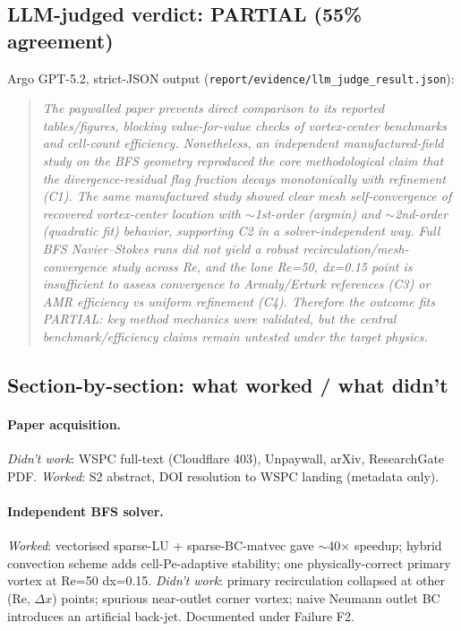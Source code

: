 \documentclass[11pt,letterpaper]{article}
\begin{document}
\subsection{LLM-judged verdict: PARTIAL (55\% agreement)}
Argo GPT-5.2, strict-JSON output (\texttt{report/evidence/llm\_judge\_result.json}):
\begin{quote}\itshape
The paywalled paper prevents direct comparison to its reported tables/figures, blocking
value-for-value checks of vortex-center benchmarks and cell-count efficiency. Nonetheless,
an independent manufactured-field study on the BFS geometry reproduced the core
methodological claim that the divergence-residual flag fraction decays monotonically with
refinement (C1). The same manufactured study showed clear mesh self-convergence of
recovered vortex-center location with $\sim$1st-order (argmin) and $\sim$2nd-order (quadratic
fit) behavior, supporting C2 in a solver-independent way. Full BFS Navier--Stokes runs did
not yield a robust recirculation/mesh-convergence study across Re, and the lone Re=50,
dx=0.15 point is insufficient to assess convergence to Armaly/Erturk references (C3) or
AMR efficiency vs uniform refinement (C4). Therefore the outcome fits PARTIAL: key method
mechanics were validated, but the central benchmark/efficiency claims remain untested under
the target physics.
\end{quote}

\subsection{Section-by-section: what worked / what didn't}
\paragraph{Paper acquisition.} \emph{Didn't work}: WSPC full-text (Cloudflare 403),
Unpaywall, arXiv, ResearchGate PDF. \emph{Worked}: S2 abstract, DOI resolution to WSPC
landing (metadata only).

\paragraph{Independent BFS solver.} \emph{Worked}: vectorised sparse-LU + sparse-BC-matvec
gave $\sim$40$\times$ speedup; hybrid convection scheme adds cell-Pe-adaptive stability;
one physically-correct primary vortex at Re=50 dx=0.15. \emph{Didn't work}: primary
recirculation collapsed at other (Re, $\Delta x$) points; spurious near-outlet corner
vortex; naive Neumann outlet BC introduces an artificial back-jet. Documented under
Failure F2.
\end{document}
